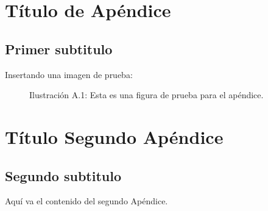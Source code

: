 \begin{appendices}
\chapter{Título de Apéndice}
\section{Primer subtitulo}

  Insertando una imagen de prueba:
  \begin{figure}
  \centering
  \caption[Figura en apéndice.]
  {Ilustraci\'on A.1: Esta es una figura de prueba para el apéndice.}
  \label{RoboAcci}
  \end{figure}

\let\cleardoublepage\clearpage
  
\chapter{Título Segundo Apéndice}
\section{Segundo subtitulo}
Aquí va el contenido del segundo Apéndice.

\end{appendices}
